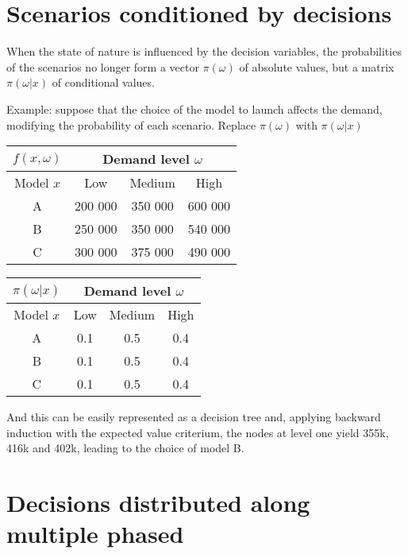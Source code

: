 \section{Scenarios conditioned by decisions}
\label{sec:scbd}

When the state of nature is influenced by the decision variables, the probabilities of the scenarios no longer form a vector $\pi (\omega)$ of absolute values, but a matrix $\pi (\omega | x)$ of conditional values.

Example: suppose that the choice of the model to launch affects the demand, modifying the probability of each scenario. Replace $\pi (\omega)$ with $\pi (\omega | x)$

\begin{table}[h]
	\centering
	\begin{tabular}{|c|c c c|}
		\multicolumn{1}{c}{$f(x, \omega)$} & \multicolumn{3}{c}{Demand level $\omega$} \\
		\hline
		Model $x$ & Low & Medium & High \\
		\hline
		A & 200 000 & 350 000 & 600 000 \\
		B & 250 000 & 350 000 & 540 000 \\
		C & 300 000 & 375 000 & 490 000 \\
		\hline
	\end{tabular}
\end{table}

\begin{table}[h]
	\centering
	\begin{tabular}{|c | c c c|}
		\multicolumn{1}{c}{$\pi(\omega|x)$} & \multicolumn{3}{c}{Demand level $\omega$} \\
		\hline
		Model $x$ & Low & Medium & High \\
		\hline
		A & 0.1 & 0.5 & 0.4 \\
		B & 0.1 & 0.5 & 0.4 \\
		C & 0.1 & 0.5 & 0.4 \\
		\hline
	\end{tabular}
\end{table}

And this can be easily represented as a decision tree and, applying backward induction with the expected value criterium, the nodes at level one yield 355k, 416k and 402k, leading to the choice of model B.

\section{Decisions distributed along multiple phased}
\label{sec:distributeddecisions}

